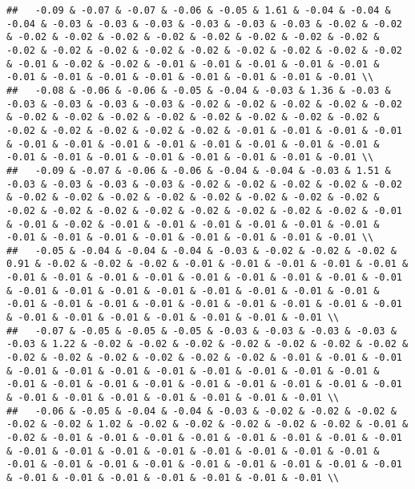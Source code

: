 \documentclass[
]{article}
\begin{document}
\begin{verbatim}
##   -0.09 & -0.07 & -0.07 & -0.06 & -0.05 & 1.61 & -0.04 & -0.04 & -0.04 & -0.03 & -0.03 & -0.03 & -0.03 & -0.03 & -0.03 & -0.02 & -0.02 & -0.02 & -0.02 & -0.02 & -0.02 & -0.02 & -0.02 & -0.02 & -0.02 & -0.02 & -0.02 & -0.02 & -0.02 & -0.02 & -0.02 & -0.02 & -0.02 & -0.02 & -0.01 & -0.02 & -0.02 & -0.01 & -0.01 & -0.01 & -0.01 & -0.01 & -0.01 & -0.01 & -0.01 & -0.01 & -0.01 & -0.01 & -0.01 & -0.01 \\ 
##   -0.08 & -0.06 & -0.06 & -0.05 & -0.04 & -0.03 & 1.36 & -0.03 & -0.03 & -0.03 & -0.03 & -0.03 & -0.02 & -0.02 & -0.02 & -0.02 & -0.02 & -0.02 & -0.02 & -0.02 & -0.02 & -0.02 & -0.02 & -0.02 & -0.02 & -0.02 & -0.02 & -0.02 & -0.02 & -0.02 & -0.01 & -0.01 & -0.01 & -0.01 & -0.01 & -0.01 & -0.01 & -0.01 & -0.01 & -0.01 & -0.01 & -0.01 & -0.01 & -0.01 & -0.01 & -0.01 & -0.01 & -0.01 & -0.01 & -0.01 \\ 
##   -0.09 & -0.07 & -0.06 & -0.06 & -0.04 & -0.04 & -0.03 & 1.51 & -0.03 & -0.03 & -0.03 & -0.03 & -0.02 & -0.02 & -0.02 & -0.02 & -0.02 & -0.02 & -0.02 & -0.02 & -0.02 & -0.02 & -0.02 & -0.02 & -0.02 & -0.02 & -0.02 & -0.02 & -0.02 & -0.02 & -0.02 & -0.02 & -0.02 & -0.01 & -0.01 & -0.02 & -0.01 & -0.01 & -0.01 & -0.01 & -0.01 & -0.01 & -0.01 & -0.01 & -0.01 & -0.01 & -0.01 & -0.01 & -0.01 & -0.01 \\ 
##   -0.05 & -0.04 & -0.04 & -0.04 & -0.03 & -0.02 & -0.02 & -0.02 & 0.91 & -0.02 & -0.02 & -0.02 & -0.01 & -0.01 & -0.01 & -0.01 & -0.01 & -0.01 & -0.01 & -0.01 & -0.01 & -0.01 & -0.01 & -0.01 & -0.01 & -0.01 & -0.01 & -0.01 & -0.01 & -0.01 & -0.01 & -0.01 & -0.01 & -0.01 & -0.01 & -0.01 & -0.01 & -0.01 & -0.01 & -0.01 & -0.01 & -0.01 & -0.01 & -0.01 & -0.01 & -0.01 & -0.01 & -0.01 & -0.01 & -0.01 \\ 
##   -0.07 & -0.05 & -0.05 & -0.05 & -0.03 & -0.03 & -0.03 & -0.03 & -0.03 & 1.22 & -0.02 & -0.02 & -0.02 & -0.02 & -0.02 & -0.02 & -0.02 & -0.02 & -0.02 & -0.02 & -0.02 & -0.02 & -0.02 & -0.01 & -0.01 & -0.01 & -0.01 & -0.01 & -0.01 & -0.01 & -0.01 & -0.01 & -0.01 & -0.01 & -0.01 & -0.01 & -0.01 & -0.01 & -0.01 & -0.01 & -0.01 & -0.01 & -0.01 & -0.01 & -0.01 & -0.01 & -0.01 & -0.01 & -0.01 & -0.01 \\ 
##   -0.06 & -0.05 & -0.04 & -0.04 & -0.03 & -0.02 & -0.02 & -0.02 & -0.02 & -0.02 & 1.02 & -0.02 & -0.02 & -0.02 & -0.02 & -0.02 & -0.01 & -0.02 & -0.01 & -0.01 & -0.01 & -0.01 & -0.01 & -0.01 & -0.01 & -0.01 & -0.01 & -0.01 & -0.01 & -0.01 & -0.01 & -0.01 & -0.01 & -0.01 & -0.01 & -0.01 & -0.01 & -0.01 & -0.01 & -0.01 & -0.01 & -0.01 & -0.01 & -0.01 & -0.01 & -0.01 & -0.01 & -0.01 & -0.01 & -0.01 \\ 

\end{verbatim}
\end{document}
